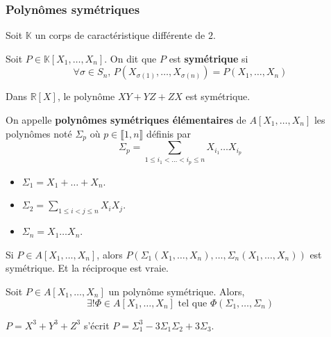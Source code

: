 	\subsubsection{Polynômes symétriques}


	Soit $\mathbb{K}$ un corps de caractéristique différente de $2$.

	\begin{definition}
		Soit $P \in \mathbb{K}[X_1, \dots, X_n]$. On dit que $P$ est \textbf{symétrique} si
		\[ \forall \sigma \in S_n, \, P(X_{\sigma(1)}, \dots, X_{\sigma(n)}) = P(X_1, \dots, X_n) \]
	\end{definition}

	\begin{example}
		Dans $\mathbb{R}[X]$, le polynôme $XY + YZ + ZX$ est symétrique.
	\end{example}

	\begin{definition}
		On appelle \textbf{polynômes symétriques élémentaires} de $A[X_1, \dots, X_n]$ les polynômes noté $\Sigma_p$ où $p \in \llbracket 1, n \rrbracket$ définis par
		\[ \Sigma_p = \sum_{1 \leq i_1 < \dots < i_p \leq n} X_{i_1} \dots X_{i_p} \]
	\end{definition}

	\begin{example}
		\begin{itemize}
			\item $\Sigma_1 = X_1 + \dots + X_n$.
			\item $\Sigma_2 = \sum_{1 \leq i < j \leq n} X_i X_j$.
			\item $\Sigma_n = X_1 \dots X_n$.
		\end{itemize}
	\end{example}

	\begin{remark}
		Si $P \in A[X_1, \dots, X_n]$, alors $P(\Sigma_1(X_1, \dots, X_n), \dots, \Sigma_n(X_1, \dots, X_n))$ est symétrique. Et la réciproque est vraie.
	\end{remark}

	\begin{theorem}
		Soit $P \in A[X_1, \dots, X_n]$ un polynôme symétrique. Alors,
		\[ \exists! \Phi \in A[X_1, \dots, X_n] \text{ tel que } \Phi(\Sigma_1, \dots, \Sigma_n) \]
	\end{theorem}

	\begin{example}
		$P = X^3 + Y^3 + Z^3$ s'écrit $P = \Sigma_1^3 - 3 \Sigma_1 \Sigma_2 + 3 \Sigma_3$.
	\end{example}

